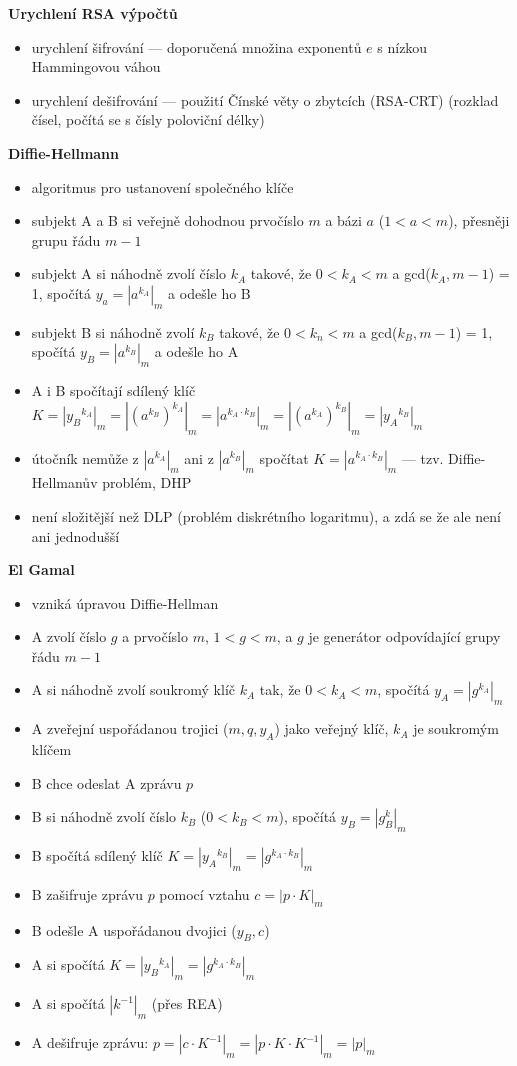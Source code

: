 \textbf{Urychlení RSA výpočtů}
\begin{itemize}
	\item urychlení šifrování --- doporučená množina exponentů $e$ s nízkou Hammingovou váhou
	\item urychlení dešifrování --- použití Čínské věty o zbytcích (RSA-CRT) (rozklad čísel, počítá se s čísly poloviční délky)
\end{itemize}

\textbf{Diffie-Hellmann}
\begin{itemize}
	\item algoritmus pro ustanovení společného klíče
	\item subjekt A a B si veřejně dohodnou prvočíslo $m$ a bázi $a$ ($1 < a < m$), přesněji grupu řádu $m-1$
	\item subjekt A si náhodně zvolí číslo $k_A$ takové, že $0 < k_A < m$ a gcd($k_A, m - 1$) = 1, spočítá $y_a = |a^{k_A}|_m$ a odešle ho B
	\item subjekt B si náhodně zvolí $k_B$ takové, že $0 < k_n < m$ a gcd($k_B, m - 1$) = 1, spočítá $y_B = |a^{k_B}|_m$ a odešle ho A
	\item A i B spočítají sdílený klíč $K = |{y_B}^{k_A}|_m = |(a^{k_B})^{k_A}|_m = |a^{k_A \cdot k_B}|_m = |(a^{k_A})^{k_B}|_m = |{y_A}^{k_B}|_m$
	\item útočník nemůže z $|a^{k_A}|_m$ ani z $|a^{k_B}|_m$ spočítat $K = |a^{k_A \cdot k_B}|_m$ --- tzv. Diffie-Hellmanův problém, DHP
	\item není složitější než DLP (problém diskrétního logaritmu), a zdá se že ale není ani jednodušší

\end{itemize}

\textbf{El Gamal}
\begin{itemize}
	\item vzniká úpravou Diffie-Hellman
	\item A zvolí číslo $g$ a prvočíslo $m$, $1 < g < m$, a $g$ je generátor odpovídající grupy řádu $m - 1$
	\item A si náhodně zvolí soukromý klíč $k_A$ tak, že $0 < k_A < m$, spočítá $y_A = |g^{k_A}|_m$
	\item A zveřejní uspořádanou trojici ($m, q, y_A$) jako veřejný klíč, $k_A$ je soukromým klíčem
	\item B chce odeslat A zprávu $p$
	\item B si náhodně zvolí číslo $k_B$ ($0 < k_B < m$), spočítá $y_B = |g^k_B|_m$
	\item B spočítá sdílený klíč $K = |{y_A}^{k_B}|_m = |g^{k_A \cdot k_B}|_m$ 
	\item B zašifruje zprávu $p$ pomocí vztahu $c = |p \cdot K|_m$
	\item B odešle A uspořádanou dvojici ($y_B, c$)
	\item A si spočítá $K = |{y_B}^{k_A}|_m = |g^{k_A \cdot k_B}|_m$
	\item A si spočítá $|k^{-1}|_m$ (přes REA)
	\item A dešifruje zprávu: $p = |c \cdot K^{-1}|_m = |p \cdot K \cdot K^{-1}|_m = |p|_m$
\end{itemize}

